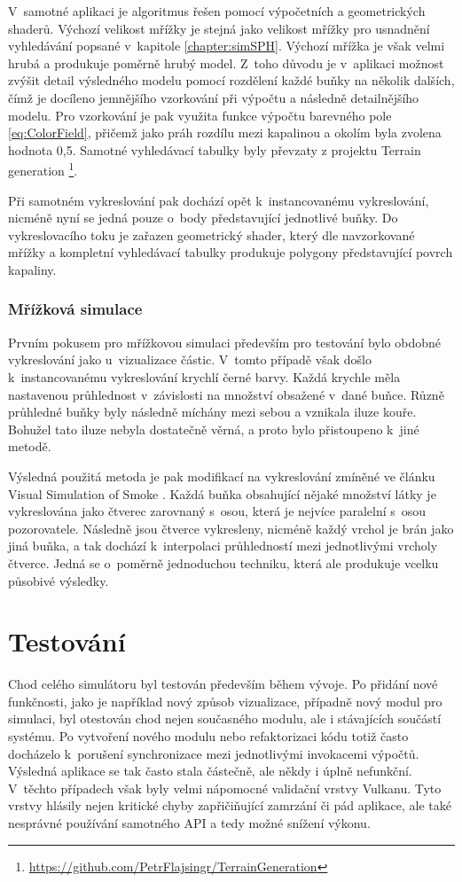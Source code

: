 V~samotné aplikaci je algoritmus řešen pomocí výpočetních a geometrických shaderů. Výchozí velikost mřížky je stejná jako velikost mřížky pro usnadnění vyhledávání popsané v~kapitole \ref{chapter:simSPH}. Výchozí mřížka je však velmi hrubá a produkuje poměrně hrubý model. Z~toho důvodu je v~aplikaci možnost zvýšit detail výsledného modelu pomocí rozdělení každé buňky na několik dalších, čímž je docíleno jemnějšího vzorkování při výpočtu a následně detailnějšího modelu. Pro vzorkování je pak využita funkce výpočtu barevného pole \ref{eq:ColorField}, přičemž jako práh rozdílu mezi kapalinou a okolím byla zvolena hodnota 0,5. Samotné vyhledávací tabulky byly převzaty z projektu Terrain generation \footnote{\url{https://github.com/PetrFlajsingr/TerrainGeneration}}. \cite{renderingSPH} 

Při samotném vykreslování pak dochází opět k~instancovanému vykreslování, nicméně nyní se jedná pouze o~body představující jednotlivé buňky. Do vykreslovacího toku je zařazen geometrický shader, který dle navzorkované mřížky a kompletní vyhledávací tabulky produkuje polygony představující povrch kapaliny.

\subsection{Mřížková simulace}
\label{chapter:vizGrid}
Prvním pokusem pro mřížkovou simulaci především pro testování bylo obdobné vykreslování jako u~vizualizace částic. V~tomto případě však došlo k~instancovanému vykreslování krychlí černé barvy. Každá krychle měla nastavenou průhlednost v~závislosti na množství obsažené v~dané buňce. Různě průhledné buňky byly následně míchány mezi sebou a vznikala iluze kouře. Bohužel tato iluze nebyla dostatečně věrná, a proto bylo přistoupeno k~jiné metodě.

Výsledná použitá metoda je pak modifikací na vykreslování zmíněné ve článku Visual Simulation of Smoke \cite{visualSmoke}. Každá buňka obsahující nějaké množství látky je vykreslována jako čtverec zarovnaný s~osou, která je nejvíce paralelní s~osou pozorovatele. Následně jsou čtverce vykresleny, nicméně každý vrchol je brán jako jiná buňka, a tak dochází k~interpolaci průhledností mezi jednotlivými vrcholy čtverce. Jedná se o~poměrně jednoduchou techniku, která ale produkuje vcelku působivé výsledky.


\chapter{Testování}
\label{chapter:testovani}
Chod celého simulátoru byl testován především během vývoje. Po přidání nové funkčnosti, jako je například nový způsob vizualizace, případně nový modul pro simulaci, byl otestován chod nejen současného modulu, ale i stávajících součástí systému. Po vytvoření nového modulu nebo refaktorizaci kódu totiž často docházelo k~porušení synchronizace mezi jednotlivými invokacemi výpočtů. Výsledná aplikace se tak často stala částečně, ale někdy i úplně nefunkční. V~těchto případech však byly velmi nápomocné validační vrstvy Vulkanu. Tyto vrstvy hlásily nejen kritické chyby zapřičiňující zamrzání či pád aplikace, ale také nesprávné používání samotného API a tedy možné snížení výkonu.

